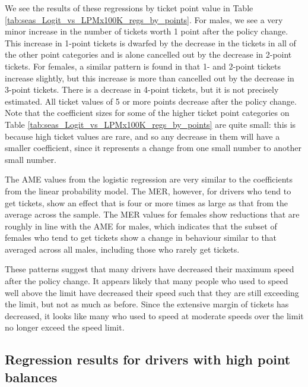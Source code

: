 


We see the results of these regressions by ticket point value in 
Table \ref{tab:seas_Logit_vs_LPMx100K_regs_by_points}. 
For males, we see a very minor increase in the number of tickets 
worth 1 point after the policy change. 
This increase in 1-point tickets is dwarfed by the decrease in the tickets 
in all of the other point categories and is alone cancelled out 
by the decrease in 2-point tickets. 
For females, a similar pattern is found in that 1- and 2-point tickets increase slightly,
but this increase is more than cancelled out by the decrease in 3-point tickets. 
There is a decrease in 4-point tickets, but it is not precisely estimated. 
All ticket values of 5 or more points decrease after the policy change. 
Note that the coefficient sizes for some of the higher ticket point categories on 
Table \ref{tab:seas_Logit_vs_LPMx100K_regs_by_points}
are quite small: 
this is because high ticket values are rare, 
and so any decrease in them will have a smaller coefficient, 
since it represents a change from one small number to another small number.

The AME values from the logistic regression are very similar to
the coefficients from the linear probability model. 
The MER, however, for drivers who tend to get tickets, 
show an effect that is four or more times as large 
as that from the average across the sample. 
The MER values for females show reductions 
that are roughly in line with the AME for males, 
which indicates that the subset of females who tend to get tickets
show a change in behaviour similar to that 
averaged across all males, including those who rarely get tickets. 


These patterns suggest that many drivers have decreased their maximum speed 
after the policy change. 
It appears likely that many people who used to speed well above the limit 
have decreased their speed such that they are still exceeding the limit, 
but not as much as before. 
Since the extensive margin of tickets has decreased, 
it looks like many who used to speed at moderate speeds over the limit 
no longer exceed the speed limit.


\subsection{Regression results for drivers with high point balances}
\label{sec:Empirical_high_pts}

